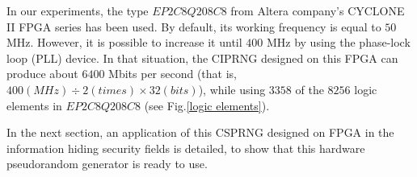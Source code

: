 In our experiments, the type $EP2C8Q208C8$ from Altera 
company's CYCLONE II FPGA series 
has been used. By default, its working
frequency is equal to $50$ MHz.
However, it is possible to increase it until
$400$ MHz by using the phase-lock loop (PLL) device.
In that situation, the CIPRNG designed on this
FPGA can produce about $6400$ Mbits per second
(that is, $400 (MHz) \div 2 (times) \times 32 (bits)$),
while using $3358$ of the $8256$ logic 
elements in $EP2C8Q208C8$ (see
Fig.\ref{logic elements}). 

In the next section, an application of this 
CSPRNG designed on FPGA in the information 
hiding security fields is detailed, to show
that this hardware pseudorandom generator 
is ready to use.
